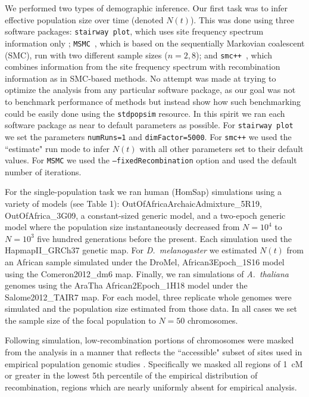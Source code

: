 \documentclass[12pt,halfline,a4paper]{ouparticle}
\newcommand{\stdpopsim}{\texttt{stdpopsim}\xspace}
\newcommand{\MSMC}{\texttt{MSMC}\xspace}
\newcommand{\smcpp}{\texttt{smc++}\xspace}
\newcommand{\stairwayplot}{\texttt{stairway plot}\xspace}
\begin{document}
We performed two types of demographic inference.
Our first task was to infer effective population size over time (denoted $N(t)$).
This was done using three software packages: \stairwayplot,
which uses site frequency spectrum information only \citep{liu2015exploring};
\MSMC~\citep{schiffels2014inferring},
which is based on the sequentially Markovian coalescent (SMC),
run with two different sample sizes ($n = 2 , 8$);
and \smcpp~\citep{terhorst2017robust},
which combines information from the site frequency spectrum with
recombination information as in SMC-based methods. No attempt
was made at trying to optimize the analysis from
any particular software package,
as our goal was not to benchmark performance of methods but
instead show how such benchmarking could be easily done using
the \stdpopsim resource. In this spirit we ran each software package as near
to default parameters as possible. For \stairwayplot we
set the parameters \texttt{numRuns=1} and \texttt{dimFactor=5000}.
For \smcpp we used the ``estimate" run mode to infer $N(t)$ with all other parameters set
to their default values. For \MSMC we used the \texttt{--fixedRecombination}
option and used the default number of iterations.

For the single-population task we ran human (HomSap) simulations
using a variety of models (see Table 1): OutOfAfricaArchaicAdmixture\_5R19, OutOfAfrica\_3G09,
a constant-sized generic model, and a two-epoch generic model where the
population size instantaneously decreased from $N=10^4$ to $N=10^3$
five hundred generations before the present. Each simulation
used the HapmapII\_GRCh37 genetic map. For \textit{D.~melanogaster}
we estimated $N(t)$ from an African sample simulated under the DroMel,
African3Epoch\_1S16 model using the Comeron2012\_dm6 map.
Finally, we ran simulations of \textit{A.~thaliana} genomes using the
AraTha African2Epoch\_1H18 model under the Salome2012\_TAIR7 map.
For each model, three replicate whole genomes were
simulated and the population size estimated from those data. In all cases we
set the sample size of the focal population to $N=50$ chromosomes.

Following simulation, low-recombination portions of chromosomes were masked
from the analysis in a manner that reflects the ``accessible" subset of sites
used in empirical population genomic studies \citep[e.g.,][]{danecek20111000,langley2012genomic}.
Specifically we masked all regions of \SI{1}{cM} or greater in the lowest 5th percentile of the empirical
distribution of recombination, regions which are nearly uniformly absent for
empirical analysis.
\end{document}
